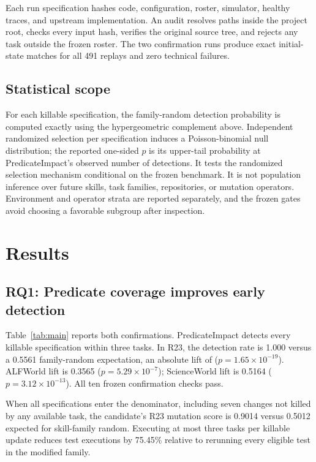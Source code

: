 \documentclass[10pt]{article}
\begin{document}
Each run specification hashes code, configuration, roster, simulator, healthy traces, and upstream implementation. An audit resolves paths inside the project root, checks every input hash, verifies the original source tree, and rejects any task outside the frozen roster. The two confirmation runs produce exact initial-state matches for all 491 replays and zero technical failures.

\subsection{Statistical scope}
For each killable specification, the family-random detection probability is computed exactly using the hypergeometric complement above. Independent randomized selection per specification induces a Poisson-binomial null distribution; the reported one-sided $p$ is its upper-tail probability at PredicateImpact's observed number of detections. It tests the randomized selection mechanism conditional on the frozen benchmark. It is not population inference over future skills, task families, repositories, or mutation operators. Environment and operator strata are reported separately, and the frozen gates avoid choosing a favorable subgroup after inspection.

\section{Results}
\subsection{RQ1: Predicate coverage improves early detection}
Table~\ref{tab:main} reports both confirmations. PredicateImpact detects every killable specification within three tasks. In R23, the detection rate is 1.000 versus a 0.5561 family-random expectation, an absolute lift of \RXXIIILift{} ($p=1.65\times10^{-19}$). ALFWorld lift is 0.3565 ($p=5.29\times10^{-7}$); ScienceWorld lift is 0.5164 ($p=3.12\times10^{-13}$). All ten frozen confirmation checks pass.

When all specifications enter the denominator, including seven changes not killed by any available task, the candidate's R23 mutation score is 0.9014 versus 0.5012 expected for skill-family random. Executing at most three tasks per killable update reduces test executions by 75.45\% relative to rerunning every eligible test in the modified family.
\end{document}
